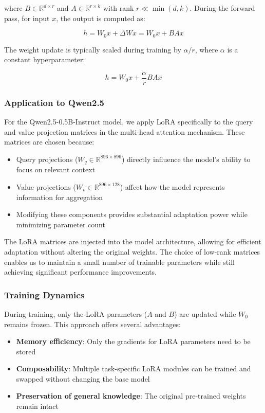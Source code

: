 \documentclass{article}
\begin{document}
where $B \in \mathbb{R}^{d \times r}$ and $A \in \mathbb{R}^{r \times k}$ with rank $r \ll \min(d,k)$. During the forward pass, for input $x$, the output is computed as:


\begin{equation}
    h = W_0x + \Delta Wx = W_0x + BAx
    \end{equation}
    
    The weight update is typically scaled during training by $\alpha/r$, where $\alpha$ is a constant hyperparameter:
    
    \begin{equation}
    h = W_0x + \frac{\alpha}{r}BAx
    \end{equation}
    
    \subsubsection*{Application to Qwen2.5}
    
    For the Qwen2.5-0.5B-Instruct model, we apply LoRA specifically to the query and value projection matrices in the multi-head attention mechanism. These matrices are chosen because:
    
    \begin{itemize}
        \item Query projections ($W_q \in \mathbb{R}^{896 \times 896}$) directly influence the model's ability to focus on relevant context
        \item Value projections ($W_v \in \mathbb{R}^{896 \times 128}$) affect how the model represents information for aggregation
        \item Modifying these components provides substantial adaptation power while minimizing parameter count
    \end{itemize}
The LoRA matrices are injected into the model architecture, allowing for efficient adaptation without altering the original weights. The choice of low-rank matrices enables us to maintain a small number of trainable parameters while still achieving significant performance improvements.
    \subsubsection*{Training Dynamics}

During training, only the LoRA parameters ($A$ and $B$) are updated while $W_0$ remains frozen. This approach offers several advantages:

\begin{itemize}
    \item \textbf{Memory efficiency}: Only the gradients for LoRA parameters need to be stored
    \item \textbf{Composability}: Multiple task-specific LoRA modules can be trained and swapped without changing the base model
    \item \textbf{Preservation of general knowledge}: The original pre-trained weights remain intact
\end{itemize}
\end{document}
